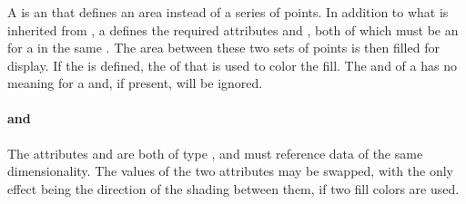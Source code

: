\begin{blockChanged}
\subsubsection{}
\label{class:shadedArea}
A \ShadedArea is an \AbstractCurve that defines an area instead of a series of points.  In addition to what is inherited from \AbstractCurve, a \ShadedArea defines the required attributes  and , both of which must be an \SIdRef for a \DataGenerator in the same \SedDocument.  The area between these two sets of points is then filled for display.  If the  is defined, the \Fill of that \Style is used to color the fill.  The \Marker and \Line of a \Style has no meaning for a \ShadedArea and, if present, will be ignored.

\paragraph*{ and }
The attributes  and  are both of type \SIdRef, and must reference data of the same dimensionality.  The values of the two attributes may be swapped, with the only effect being the direction of the shading between them, if two fill colors are used.

\end{blockChanged}




